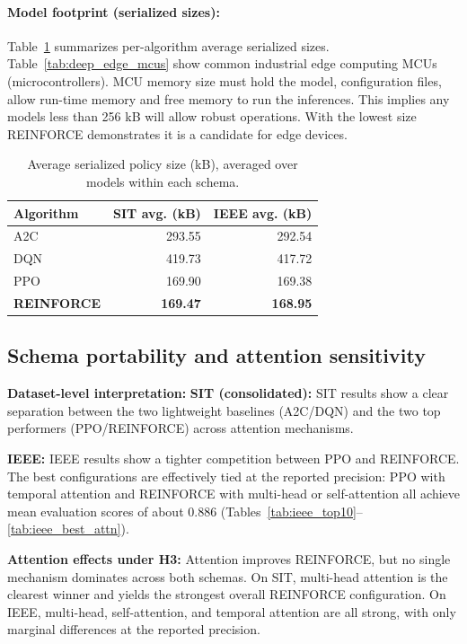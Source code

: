 \documentclass[sn-basic]{sn-jnl} %
\begin{document}
\paragraph{Model footprint (serialized sizes):} 
Table~\ref{tab:model_size_summary} summarizes per-algorithm average serialized sizes. Table~\ref{tab:deep_edge_mcus} show common industrial edge computing MCUs (microcontrollers). MCU memory size must hold the model, configuration files, allow run-time memory and free memory to run the inferences. This implies any models less than 256 kB will allow robust operations. With the lowest size REINFORCE demonstrates it is a candidate for edge devices.

\begin{table}[htbp]
\centering
\caption{Average serialized policy size (kB), averaged over models within each schema.}
\label{tab:model_size_summary}
\begin{tabular}{l r r}
\toprule
	\textbf{Algorithm} & \textbf{SIT avg. (kB)} & \textbf{IEEE avg. (kB)}\\
	\midrule
	A2C & 293.55 & 292.54\\
	DQN & 419.73 & 417.72\\
	PPO & 169.90 & 169.38\\
	\textbf{REINFORCE} & \textbf{169.47} & \textbf{168.95}\\
\bottomrule
\end{tabular}
\end{table}

\subsection{Schema portability and attention sensitivity}
\textbf{Dataset-level interpretation:}
\textbf{SIT (consolidated):} SIT results show a clear separation between the two lightweight baselines (A2C/DQN) and the two top performers (PPO/\textsc{REINFORCE}) across attention mechanisms.

\textbf{IEEE:} IEEE results show a tighter competition between PPO and \textsc{REINFORCE}. The best configurations are effectively tied at the reported precision: PPO with temporal attention and \textsc{REINFORCE} with multi-head or self-attention all achieve mean evaluation scores of about 0.886 (Tables~\ref{tab:ieee_top10}--\ref{tab:ieee_best_attn}).

\textbf{Attention effects under H3:}
Attention improves \textsc{REINFORCE}, but no single mechanism dominates across both schemas. On SIT, multi-head attention is the clearest winner and yields the strongest overall \textsc{REINFORCE} configuration. On IEEE, multi-head, self-attention, and temporal attention are all strong, with only marginal differences at the reported precision.
\end{document}
